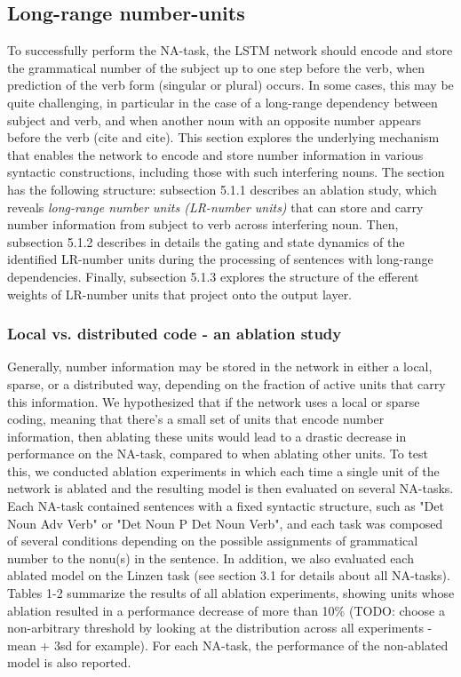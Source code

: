 \subsection{Long-range number-units}
To successfully perform the NA-task, the LSTM network should encode and store the grammatical number of the subject up to one step before the verb, when prediction of the verb form (singular or plural) occurs. In some cases, this may be quite challenging, in particular in the case of a long-range dependency between subject and verb, and when another noun with an opposite number appears before the verb (cite and cite). This section explores the underlying mechanism that enables the network to encode and store number information in various syntactic constructions, including those with such interfering nouns. The section has the following structure: subsection 5.1.1 describes an ablation study, which reveals \textit{long-range number units (LR-number units)} that can store and carry number information from subject to verb across interfering noun. Then, subsection 5.1.2 describes in details the gating and state dynamics of the identified LR-number units during the processing of sentences with long-range dependencies. Finally, subsection 5.1.3 explores the structure of the efferent weights of LR-number units that project onto the output layer.

\subsubsection{Local vs. distributed code - an ablation study}
Generally, number information may be stored in the network in either a local, sparse, or a distributed way, depending on the fraction of active units that carry this information. We hypothesized that if the network uses a local or sparse coding, meaning that there's a small set of units that encode number information, then ablating these units would lead to a drastic decrease in performance on the NA-task, compared to when ablating other units. To test this, we conducted ablation experiments in which each time a single unit of the network is ablated and the resulting model is then evaluated on several NA-tasks. Each NA-task contained sentences with a fixed syntactic structure, such as "Det Noun Adv Verb" or "Det Noun P Det Noun Verb", and each task was composed of several conditions depending on the possible assignments of grammatical number to the nonu(s) in the sentence. In addition, we also evaluated each ablated model on the Linzen task (see section 3.1 for details about all NA-tasks). Tables 1-2 summarize the results of all ablation experiments, showing units whose ablation resulted in a performance decrease of more than 10\% (TODO: choose a non-arbitrary threshold by looking at the distribution across all experiments - mean + 3sd for example). For each NA-task, the performance of the non-ablated model is also reported.

